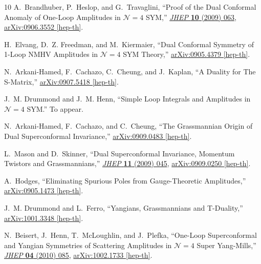 \documentclass[11pt, reqno]{article}
\begin{document}
\begin{thebibliography}{10}
A.~Brandhuber, P.~Heslop, and G.~Travaglini, ``{Proof of the Dual Conformal
  Anomaly of One-Loop Amplitudes in $\mathcal{N}=4$ SYM},''
  \href{http://dx.doi.org/10.1088/1126-6708/2009/10/063}{{\em JHEP} {\bf 10}
  (2009)  063},
\href{http://arxiv.org/abs/0906.3552}{{ arXiv:0906.3552 [hep-th]}}.

H.~Elvang, D.~Z. Freedman, and M.~Kiermaier, ``{Dual Conformal Symmetry of
  1-Loop NMHV Amplitudes in $\mathcal{N}=4$ SYM Theory},''
\href{http://arxiv.org/abs/0905.4379}{{ arXiv:0905.4379 [hep-th]}}.

N.~Arkani-Hamed, F.~Cachazo, C.~Cheung, and J.~Kaplan, ``{A Duality for The
  S-Matrix},''
\href{http://arxiv.org/abs/0907.5418}{{ arXiv:0907.5418 [hep-th]}}.

J.~M. Drummond and J.~M. Henn, ``{Simple Loop Integrals and Amplitudes in
  $\mathcal{N}=4$ SYM}.'' To appear.

N.~Arkani-Hamed, F.~Cachazo, and C.~Cheung, ``{The Grassmannian Origin of Dual
  Superconformal Invariance},''
\href{http://arxiv.org/abs/0909.0483}{{ arXiv:0909.0483 [hep-th]}}.

L.~Mason and D.~Skinner, ``{Dual Superconformal Invariance, Momentum Twistors
  and Grassmannians},''
  \href{http://dx.doi.org/10.1088/1126-6708/2009/11/045}{{\em JHEP} {\bf 11}
  (2009)  045},
\href{http://arxiv.org/abs/0909.0250}{{ arXiv:0909.0250 [hep-th]}}.

A.~Hodges, ``{Eliminating Spurious Poles from Gauge-Theoretic Amplitudes},''
\href{http://arxiv.org/abs/0905.1473}{{ arXiv:0905.1473 [hep-th]}}.

J.~M. Drummond and L.~Ferro, ``{Yangians, Grassmannians and T-{D}uality},''
\href{http://arxiv.org/abs/1001.3348}{{ arXiv:1001.3348 [hep-th]}}.

N.~Beisert, J.~Henn, T.~McLoughlin, and J.~Plefka, ``{One-Loop Superconformal
  and Yangian Symmetries of Scattering Amplitudes in $\mathcal{N}=4$ Super
  Yang-Mills},'' \href{http://dx.doi.org/10.1007/JHEP04(2010)085}{{\em JHEP}
  {\bf 04} (2010)  085},
\href{http://arxiv.org/abs/1002.1733}{{ arXiv:1002.1733 [hep-th]}}.


\end{thebibliography}
\end{document}
